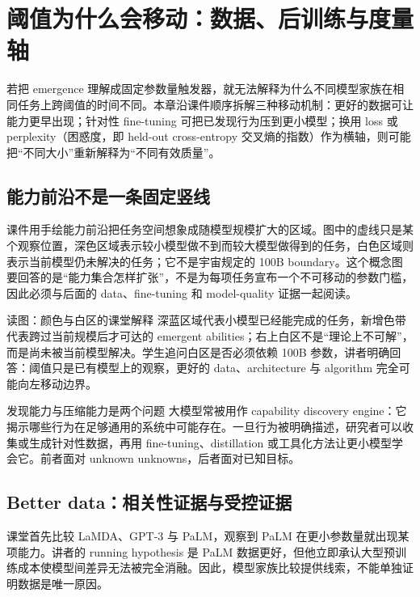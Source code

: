 \section{阈值为什么会移动：数据、后训练与度量轴}

若把 emergence 理解成固定参数量触发器，就无法解释为什么不同模型家族在相同任务上跨阈值的时间不同。本章沿课件顺序拆解三种移动机制：更好的数据可让能力更早出现；针对性 fine-tuning 可把已发现行为压到更小模型；换用 loss 或 perplexity（困惑度，即 held-out cross-entropy 交叉熵的指数）作为横轴，则可能把“不同大小”重新解释为“不同有效质量”。

\subsection{能力前沿不是一条固定竖线}

课件用手绘能力前沿把任务空间想象成随模型规模扩大的区域。图中的虚线只是某个观察位置，深色区域表示较小模型做不到而较大模型做得到的任务，白色区域则表示当前模型仍未解决的任务；它不是宇宙规定的 100B boundary。这个概念图要回答的是“能力集合怎样扩张”，不是为每项任务宣布一个不可移动的参数门槛，因此必须与后面的 data、fine-tuning 和 model-quality 证据一起阅读。


\begin{knowledgebox}{读图：颜色与白区的课堂解释}
深蓝区域代表小模型已经能完成的任务，新增色带代表跨过当前规模后才可达的 emergent abilities；右上白区不是“理论上不可解”，而是尚未被当前模型解决。学生追问白区是否必须依赖 100B 参数，讲者明确回答：阈值只是已有模型上的观察，更好的 data、architecture 与 algorithm 完全可能向左移动边界。
\end{knowledgebox}

\begin{importantbox}{发现能力与压缩能力是两个问题}
大模型常被用作 capability discovery engine：它揭示哪些行为在足够通用的系统中可能存在。一旦行为被明确描述，研究者可以收集或生成针对性数据，再用 fine-tuning、distillation 或工具化方法让更小模型学会它。前者面对 unknown unknowns，后者面对已知目标。
\end{importantbox}

\subsection{Better data：相关性证据与受控证据}

课堂首先比较 LaMDA、GPT-3 与 PaLM，观察到 PaLM 在更小参数量就出现某项能力。讲者的 running hypothesis 是 PaLM 数据更好，但他立即承认大型预训练成本使模型间差异无法被完全消融。因此，模型家族比较提供线索，不能单独证明数据是唯一原因。

